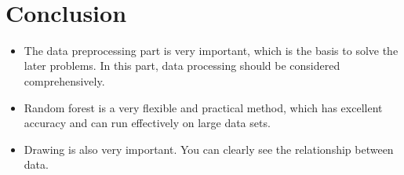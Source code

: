 
	
\ 


\section{Conclusion}
\begin{itemize}
 \item The data preprocessing part is very important, which is the basis to solve the later problems. In this part, data processing should be considered comprehensively.
 \item Random forest is a very flexible and practical method, which has excellent accuracy and can run effectively on large data sets.
 \item Drawing is also very important. You can clearly see the relationship between data.
\end{itemize}










